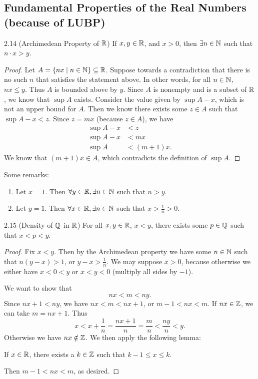 \documentclass[class=article, crop=false]{standalone}
\begin{document}
  \subsection{Fundamental Properties of the Real Numbers (because of LUBP)}
  \begin{theorem}{2.14 (Archimedean Property of $\mathbb{R}$)}
    If $x, y\in\mathbb{R}$, and $x > 0$, then $\exists n\in \mathbb{N}$ such that $n\cdot x > y$.
    \begin{proof}
      Let $A = \left\{nx\mid n\in\mathbb{N}\right\}\subseteq \mathbb{R}$. Suppose towards a contradiction that there is no such $n$ that satisfies the statement above. In other words, for all $n\in\mathbb{N}$, $nx \leq y$. Thus $A$ is bounded above by $y$. Since $A$ is nonempty and is a subset of $\mathbb{R}$, we know that $\sup A$ exists. Consider the value given by $\sup A - x$, which is not an upper bound for $A$. Then we know there exists some $z\in A$ such that $\sup A - x < z$. Since $z = mx$ (because $z\in A$), we have
      \begin{align*}
        \sup A - x &< z \\
        \sup A - x &< mx \\
        \sup A &< (m + 1)x.
      \end{align*}
      We know that $(m + 1)x\in A$, which contradicts the definition of $\sup A$.
    \end{proof}
  \end{theorem}
  Some remarks:
  \begin{enumerate}
    \item Let $x = 1$. Then $\forall y\in\mathbb{R}, \exists n\in\mathbb{N}$ such that $n > y$.
    \item Let $y = 1$. Then $\forall x\in\mathbb{R}, \exists n\in\mathbb{N}$ such that $x > \frac{1}{n} > 0$.
  \end{enumerate}
  \begin{theorem}{2.15 (Density of $\mathbb{Q}$ in $\mathbb{R}$)}
    For all $x,y\in \mathbb{R}$, $x < y$, there exists some $p\in\mathbb{Q}$ such that $x < p < y$.
    \begin{proof}
      Fix $x < y$. Then by the Archimedean property we have some $n\in\mathbb{N}$ such that $n(y - x) > 1$, or $y - x > \frac{1}{n}$. We may suppose $x > 0$, because otherwise we either have $x < 0 < y$ or $x < y < 0$ (multiply all sides by $-1$). \par
      We want to show that
      \[
        nx < m < ny.
      \]
      Since $nx + 1 < ny$, we have $nx < m < nx + 1$, or $m - 1 < nx < m$. If $nx\in\mathbb{Z}$, we can take $m = nx + 1$. Thus
      \[
        x < x + \frac{1}{n} = \frac{nx + 1}{n} = \frac{m}{n} < \frac{ny}{n} < y.
      \]
      Otherwise we have $nx\notin \mathbb{Z}$. We then apply the following lemma:
      \begin{lemma}{}
        If $x\in\mathbb{R}$, there exists a $k\in\mathbb{Z}$ such that $k - 1\leq x\leq k$.
      \end{lemma}
      Then $m - 1 < nx < m$, as desired.
    \end{proof}
  \end{theorem}
\end{document}
